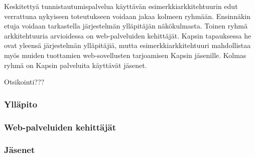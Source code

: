 Keskitettyä tunnistautumispalvelua käyttävän esimerkkiarkkitehtuurin edut verrattuna nykyiseen toteutukseen voidaan jakaa kolmeen ryhmään. Ensinnäkin etuja voidaan tarkastella järjestelmän ylläpitäjän näkökulmasta. Toinen ryhmä arkkitehtuuria arvioidessa on web-palveluiden kehittäjät. Kapsin tapauksessa he ovat yleensä järjestelmän ylläpitäjiä, mutta esimerkkiarkkitehtuuri mahdollistaa myös muiden tuottamien web-sovellusten tarjoamisen Kapsin jäsenille. Kolmas ryhmä on Kapsin palveluita käyttävät jäsenet.

Otsikointi???

\subsubsection{Ylläpito}


\subsubsection{Web-palveluiden kehittäjät}


\subsubsection{Jäsenet}
